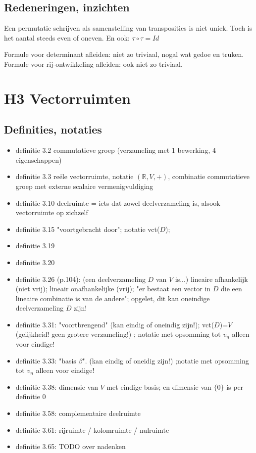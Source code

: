 \documentclass{article}
\begin{document}
\subsection{Redeneringen, inzichten}

Een permutatie schrijven als samenstelling van transposities is niet uniek. Toch is het aantal steeds even of oneven. En ook: $\tau \circ \tau = Id$

Formule voor determinant afleiden: niet zo triviaal, nogal wat gedoe en truken. 
Formule voor rij-ontwikkeling afleiden: ook niet zo triviaal. 
 

\section{H3 Vectorruimten}

\subsection{Definities, notaties}

\begin{itemize}
    \item definitie 3.2 commutatieve groep (verzameling met 1 bewerking, 4 eigenschappen)
    \item definitie 3.3 re\"ele vectorruimte, notatie $(\mathbb{R},V,+)$, combinatie commutatieve groep met externe scalaire vermenigvuldiging
    \item definitie 3.10 deelruimte = iets dat zowel deelverzameling is, alsook vectorruimte op zichzelf
    \item definitie 3.15 "voortgebracht door"; notatie vct($D$); 
    \item definitie 3.19 
    \item definitie 3.20 
    \item definitie 3.26 (p.104): (een deelverzameling $D$ van $V$ is...) lineaire afhankelijk (niet vrij); lineair onafhankelijke (vrij); "er bestaat een vector in $D$ die een lineaire combinatie is van de andere"; opgelet, dit kan oneindige deelverzameling $D$ zijn! 
    \item definitie 3.31: "voortbrengend" (kan eindig of oneindig zijn!); vct($D$)=$V$ (gelijkheid! geen grotere verzameling!) ; notatie met opsomming tot $v_n$ alleen voor eindige! 
    \item definitie 3.33: "basis $\beta$". (kan eindig of oneidig zijn!) ;notatie met opsomming tot $v_n$ alleen voor eindige! 
    \item definitie 3.38: dimensie van $V$ met eindige basis; en dimensie van $\{ 0\}$ is per definitie $0$
    \item definitie 3.58: complementaire deelruimte
    \item definitie 3.61: rijruimte / kolomruimte / nulruimte 
    \item definitie 3.65: TODO over nadenken 
\end{itemize}
\end{document}

